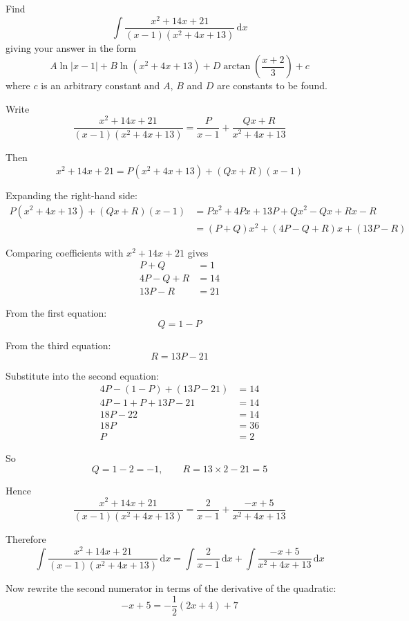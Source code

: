 \documentclass[leqno]{article}
\begin{document}
\begin{enumerate}[
  label=\textbf{\arabic*.},
  leftmargin=*,
  topsep=0pt,
  partopsep=0pt,
  parsep=0pt
]
\newpage

\questionitem

Find
\[
\int \frac{x^2+14x+21}{(x-1)(x^2+4x+13)}\,\mathrm{d}x
\]
giving your answer in the form
\[
A\ln|x-1|+B\ln(x^2+4x+13)+D\arctan\left(\frac{x+2}{3}\right)+c
\]
where $c$ is an arbitrary constant and $A$, $B$ and $D$ are constants to be found.  \\

\vspace*{10pt}

\begin{djsSolution}
Write
\[
\frac{x^2+14x+21}{(x-1)(x^2+4x+13)}=\frac{P}{x-1}+\frac{Qx+R}{x^2+4x+13}
\]

Then
\[
x^2+14x+21=P(x^2+4x+13)+(Qx+R)(x-1)
\]

Expanding the right-hand side:
\begin{align*}
P(x^2+4x+13)+(Qx+R)(x-1)
&=Px^2+4Px+13P+Qx^2-Qx+Rx-R \\
&=(P+Q)x^2+(4P-Q+R)x+(13P-R)
\end{align*}

Comparing coefficients with $x^2+14x+21$ gives
\begin{align*}
P+Q&=1 \\
4P-Q+R&=14 \\
13P-R&=21
\end{align*}

From the first equation:
\[
Q=1-P
\]

From the third equation:
\[
R=13P-21
\]

Substitute into the second equation:
\begin{align*}
4P-(1-P)+(13P-21)&=14 \\
4P-1+P+13P-21&=14 \\
18P-22&=14 \\
18P&=36 \\
P&=2
\end{align*}

So
\[
Q=1-2=-1,\qquad R=13\times 2-21=5
\]

Hence
\[
\frac{x^2+14x+21}{(x-1)(x^2+4x+13)}
=\frac{2}{x-1}+\frac{-x+5}{x^2+4x+13}
\]

Therefore
\[
\int \frac{x^2+14x+21}{(x-1)(x^2+4x+13)}\,\mathrm{d}x
=\int \frac{2}{x-1}\,\mathrm{d}x+\int \frac{-x+5}{x^2+4x+13}\,\mathrm{d}x
\]

Now rewrite the second numerator in terms of the derivative of the quadratic:
\[
-x+5=-\frac12(2x+4)+7
\]


\end{djsSolution}
\end{enumerate}
\end{document}
